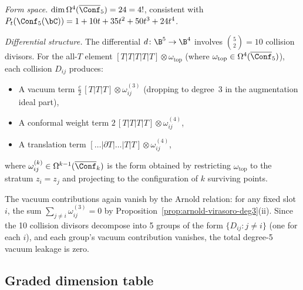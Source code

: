 \begin{computation}
\label{comp:virasoro-deg5}

\emph{Form space.}
$\dim \Omega^4(\overline{\Conf}_5) = 24 = 4!$, consistent with
$P_t(\Conf_5(\bC)) = 1 + 10t + 35t^2 + 50t^3 + 24t^4$.

\emph{Differential structure.}
The differential $d\colon \B^5 \to \B^4$ involves $\binom{5}{2} = 10$
collision divisors.  For the all-$T$ element
$[T|T|T|T|T] \otimes \omega_{\mathrm{top}}$
(where $\omega_{\mathrm{top}} \in \Omega^4(\overline{\Conf}_5)$),
each collision $D_{ij}$ produces:
\begin{itemize}
\item A vacuum term $\frac{c}{2}\,[T|T|T] \otimes \omega^{(3)}_{ij}$
  (dropping to degree~3 in the augmentation ideal part),
\item A conformal weight term
  $2\,[T|T|T|T] \otimes \omega^{(4)}_{ij}$,
\item A translation term
  $[\ldots|\partial T|\ldots|T|T] \otimes \omega^{(4)}_{ij}$,
\end{itemize}
where $\omega^{(k)}_{ij} \in \Omega^{k-1}(\overline{\Conf}_k)$ is the
form obtained by restricting $\omega_{\mathrm{top}}$ to the stratum
$z_i = z_j$ and projecting to the configuration of $k$ surviving points.

The vacuum contributions again vanish by the Arnold relation:
for any fixed slot $i$, the sum $\sum_{j \neq i} \omega^{(3)}_{ij} = 0$
by Proposition~\ref{prop:arnold-virasoro-deg3}(ii).
Since the 10 collision divisors decompose into 5 groups of the form
$\{D_{ij} : j \neq i\}$ (one for each $i$), and each group's vacuum
contribution vanishes, the total degree-5 vacuum leakage is zero.
\end{computation}

\subsection{Graded dimension table}

